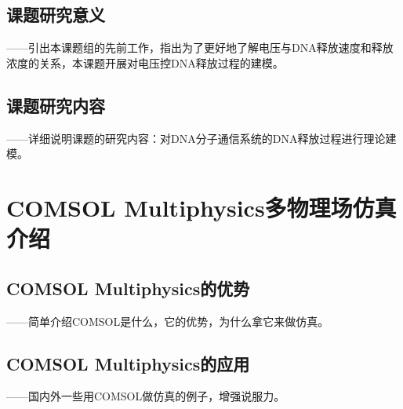 \subsection{课题研究意义}
——引出本课题组的先前工作，指出为了更好地了解电压与DNA释放速度和释放浓度的关系，本课题开展对电压控DNA释放过程的建模。
\subsection{课题研究内容}
——详细说明课题的研究内容：对DNA分子通信系统的DNA释放过程进行理论建模。

\section{COMSOL Multiphysics多物理场仿真介绍}
\subsection{COMSOL Multiphysics的优势}
——简单介绍COMSOL是什么，它的优势，为什么拿它来做仿真。
\subsection{COMSOL Multiphysics的应用}
——国内外一些用COMSOL做仿真的例子，增强说服力。

